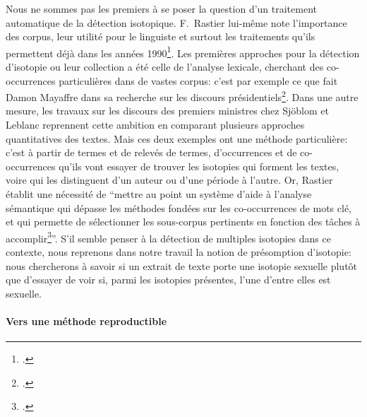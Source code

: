 Nous ne sommes pas les premiers à se poser la question d'un traitement automatique de la détection isotopique. F.~Rastier lui-même note l'importance des corpus, leur utilité pour le linguiste et surtout les traitements qu'ils permettent déjà dans les années 1990\footcite{rastier_semantique_1996}. Les premières approches pour la détection d'isotopie ou leur collection a été celle de l'analyse lexicale, cherchant des co-occurrences particulières dans de vastes corpus: c'est par exemple ce que fait Damon Mayaffre dans sa recherche sur les discours présidentiels\footcite{mayaffre2008occurrence}. Dans une autre mesure, les travaux sur les discours des premiers ministres chez Sjöblom et Leblanc reprennent cette ambition en comparant plusieurs approches quantitatives des textes. Mais ces deux exemples ont une méthode particulière: c'est à partir de termes et de relevés de termes, d'occurrences et de co-occurrences qu'ils vont essayer de trouver les isotopies qui forment les textes, voire qui les distinguent d'un auteur ou d'une période à l'autre. Or, Rastier établit une nécessité de \enquote{mettre  au  point  un  système  d’aide à l’analyse  sémantique  qui dépasse les méthodes fondées sur les co-occurrences de mots clé, et qui permette de sélectionner les sous-corpus pertinents en fonction des tâches à accomplir\footcite[p.~31]{rastier_semantique_1996}}. S'il semble penser à la détection de multiples isotopies dans ce contexte, nous reprenons dans notre travail la notion de présomption d'isotopie: nous chercherons à savoir si un extrait de texte porte une isotopie sexuelle plutôt que d'essayer de voir si, parmi les isotopies présentes, l'une d'entre elles est sexuelle.

\paragraph{Vers une méthode reproductible}


